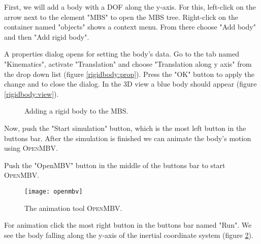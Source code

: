 \documentclass[
a4paper,
fleqn,
DIV=15,
pagesize
]{scrartcl}
\begin{document}
First, we will add a body with a DOF along the {\color{green}y-axis}.  For this,
left-click on the arrow next to the element "MBS" to open the MBS tree.
Right-click on the container named "objects" shows a context menu. From there
choose "Add body" and then "Add rigid body".

A properties dialog opens for setting the body's data. Go to the tab named
"Kinematics", activate "Translation" and choose "Translation along y axis" from
the drop down list (figure \ref{rigidbody:prop}). Press the "OK" button to
apply the change and to close the dialog. In the 3D view a blue body should
appear (figure \ref{rigidbody:view}).
\begin{figure}
\centering
{}
\caption{Adding a rigid body to the MBS.} \label{rigidbody}
\end{figure}

Now, push the "Start simulation" button, which is the most left button in the
buttons bar. After the simulation is finished we can animate the body's
motion using \textsc{OpenMBV}.

Push the "OpenMBV" button in the middle of the buttons bar to start
\textsc{OpenMBV}.
\begin{figure}
\centering
\texttt{[image: openmbv]}
\caption{The animation tool \textsc{OpenMBV}.} \label{openmbv}
\end{figure}
For animation click
the most right button in the buttons bar named "Run". We see the body falling
along the {\color{green}y-axis} of the inertial coordinate system (figure
\ref{openmbv}).
\end{document}
